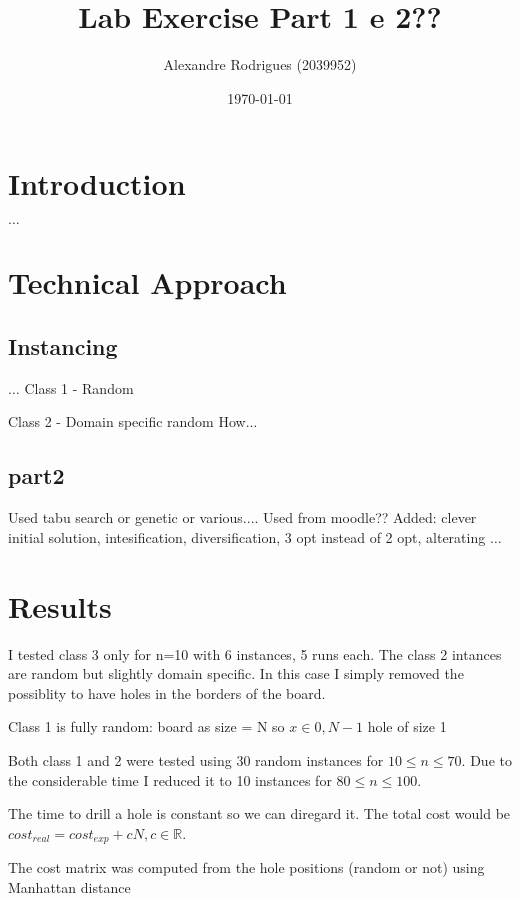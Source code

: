 \documentclass[a4paper, 11pt]{article}
\begin{document}
	
	\title{Lab Exercise Part 1 e 2?? }
	\author{{\small Alexandre Rodrigues (2039952)}}
	\date{\today}
	\maketitle
	
	\section{Introduction}
		$\ldots$
		
	\section{Technical Approach}
		
		
		\subsection{Instancing}
			$\ldots$
			Class 1 - Random
			
			Class 2 - Domain specific random
				How...
				
		\subsection{part2}
			Used tabu search or genetic or various....
			Used from moodle?? Added: clever initial solution, intesification, diversification, 3 opt instead of 2 opt, alterating $\ldots$	
			
	
	\section{Results}
		I tested class 3 only for n=10 with 6 instances, 5 runs each.
		The class 2 intances are random but slightly domain specific.
		In this case I simply removed the possiblity to have holes in the borders of the board.
		
		Class 1 is fully random:
		board as size = N
		so $ x \in {0,N-1}$
		hole of size 1
		
		Both class 1 and 2 were tested using 30 random instances for $ 10 \le n \le 70 $.
		Due to the considerable time I reduced it to 10 instances for $ 80 \le n \le 100 $.
		
		
		The time to drill a hole is constant so we can diregard it.
		The total cost would be $ cost_{real}  = cost_{exp} + cN, c\in \mathbb{R}$.
		
		The cost matrix was computed from the hole positions (random or not) using Manhattan distance
	
\end{document}
